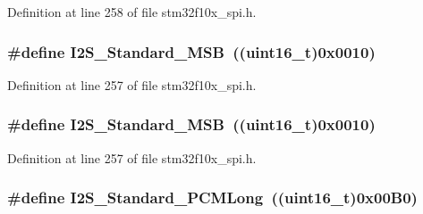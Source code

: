 Definition at line 258 of file stm32f10x\+\_\+spi.\+h.

\subsubsection[{\texorpdfstring{I2\+S\+\_\+\+Standard\+\_\+\+M\+SB}{I2S_Standard_MSB}}]{\setlength{\rightskip}{0pt plus 5cm}\#define I2\+S\+\_\+\+Standard\+\_\+\+M\+SB~(({\bf uint16\+\_\+t})0x0010)}\hypertarget{group___i2_s___standard_gae716cfa7e031affc37fe65dd80b0e6f4}{}\label{group___i2_s___standard_gae716cfa7e031affc37fe65dd80b0e6f4}


Definition at line 257 of file stm32f10x\+\_\+spi.\+h.

\subsubsection[{\texorpdfstring{I2\+S\+\_\+\+Standard\+\_\+\+M\+SB}{I2S_Standard_MSB}}]{\setlength{\rightskip}{0pt plus 5cm}\#define I2\+S\+\_\+\+Standard\+\_\+\+M\+SB~(({\bf uint16\+\_\+t})0x0010)}\hypertarget{group___i2_s___standard_gae716cfa7e031affc37fe65dd80b0e6f4}{}\label{group___i2_s___standard_gae716cfa7e031affc37fe65dd80b0e6f4}


Definition at line 257 of file stm32f10x\+\_\+spi.\+h.

\subsubsection[{\texorpdfstring{I2\+S\+\_\+\+Standard\+\_\+\+P\+C\+M\+Long}{I2S_Standard_PCMLong}}]{\setlength{\rightskip}{0pt plus 5cm}\#define I2\+S\+\_\+\+Standard\+\_\+\+P\+C\+M\+Long~(({\bf uint16\+\_\+t})0x00\+B0)}\hypertarget{group___i2_s___standard_gaf79cb88702059506d876dbd776d7a136}{}\label{group___i2_s___standard_gaf79cb88702059506d876dbd776d7a136}


